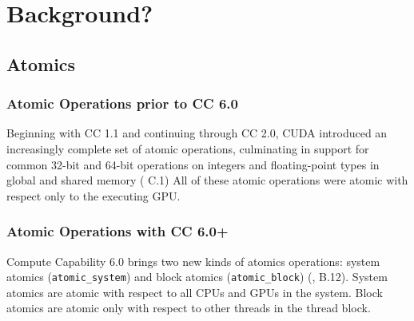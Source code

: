 \section{Background?}

\subsection{Atomics}

\subsubsection{Atomic Operations prior to CC 6.0}

Beginning with CC 1.1 and continuing through CC 2.0, CUDA introduced an increasingly complete set of atomic operations, culminating in support for common 32-bit and 64-bit operations on integers and floating-point types in global and shared memory (\cite{nvidia2008cuda20} C.1)
All of these atomic operations were atomic with respect only to the executing GPU.

\subsubsection{Atomic Operations with CC 6.0+}

Compute Capability 6.0 brings two new kinds of atomics operations: system atomics (\texttt{atomic\*\_system}) and block atomics (\texttt{atomic\*\_block}) (\cite{nvidia2017cuda80}, B.12).
System atomics are atomic with respect to all CPUs and GPUs in the system.
Block atomics are atomic only with respect to other threads in the thread block.



